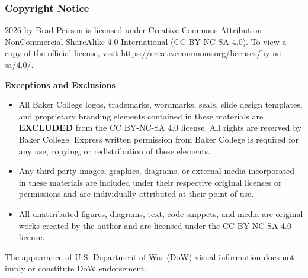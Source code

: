 \begin{frame}
    \frametitle{Copyright Notice}
    
    {\scriptsize
    \PresTitle{} \textcopyright{} 2026 by Brad Peirson is licensed under Creative Commons Attribution-NonCommercial-ShareAlike 4.0 International (CC BY-NC-SA 4.0). To view a copy of the official license, visit \href{https://creativecommons.org/licenses/by-nc-sa/4.0/}{https://creativecommons.org/licenses/by-nc-sa/4.0/}.

    \vspace{0.5em}

    \textbf{Exceptions and Exclusions}

    \begin{itemize}
        \item[Baker College Branding \& Trademarks:]All Baker College logos, trademarks, wordmarks, seals, slide design templates, and proprietary branding elements contained in these materials are \textbf{EXCLUDED} from the CC BY-NC-SA 4.0 license. All rights are reserved by Baker College. Express written permission from Baker College is required for any use, copying, or redistribution of these elements.
        \item[Third-Party Media \& Content:] Any third-party images, graphics, diagrams, or external media incorporated in these materials are included under their respective original licenses or permissions and are individually attributed at their point of use. 
        \item[Original Author Content:] All unattributed figures, diagrams, text, code snippets, and media are original works created by the author and are licensed under the CC BY-NC-SA 4.0 license.
    \end{itemize}

    The appearance of U.S. Department of War (DoW) visual information does not imply or constitute DoW endorsement.
    \par}
\end{frame}





